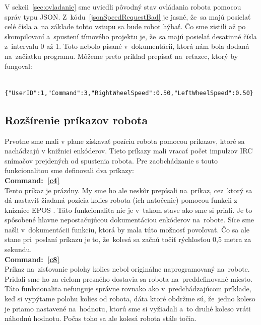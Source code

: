 V sekcii~\ref{sec:ovladanie} sme uviedli pôvodný stav ovládania robota pomocou správ typu JSON.
Z~kódu~\ref{jsonSpeedRequestBad} je jasné, že~sa majú posielať celé čísla a~na základe tohto vstupu sa bude robot hýbať. Čo sme zistili až
po skompilovaní a~spustení tímového projektu je, že~sa majú posielať desatinné čísla z~intervalu 0 až 1. Toto nebolo písané
v~dokumentácii, ktorá nám bola dodaná na~začiatku programu. Môžeme preto príklad prepísať na~reťazec, ktorý by fungoval:

	\label{jsonSpeedRequestGood}
	\begin{lstlisting}
			{"UserID":1,"Command":3,"RightWheelSpeed":0.50,"LeftWheelSpeed":0.50}
	\end{lstlisting}

\subsection{Rozšírenie príkazov robota}
\label{subsec:extendRobotCommands}

Prvotne sme mali v plane získavať pozíciu robota pomocou príkazov, ktoré sa nachádzajú v knižnici enkóderov.
Tieto príkazy mali vracať počet impulzov IRC snímačov prejdených od spustenia robota.
Pre zaobchádzanie s touto funkcionalitou sme definovali dva príkazy:\\

\noindent \textbf{Command:~\ref{c4}} \\
\indent Tento príkaz je prázdny. My sme ho ale neskôr prepísali na~príkaz, cez~ktorý sa dá nastaviť
žiadaná pozícia kolies robota (ich natočenie) pomocou funkcii z kniznice EPOS \cite{EPOSdoc}.
Táto funkcionalita nie je v~takom stave ako sme si priali. Je to spôsobené hlavne nepostačujúcou dokumentáciou enkóderov na~robote. Síce sme našli
v~dokumentácii funkciu, ktorá by mala túto možnosť povoľovať. Čo sa ale stane pri~poslaní príkazu je to, že~kolesá sa začnú točiť rýchlosťou
0,5 metra za sekundu.\\

\noindent \textbf{Command:~\ref{c8}} \\
\indent Príkaz na~zisťovanie polohy kolies nebol originálne naprogramovaný na~robote. Pridali sme ho za cieľom presného dostavia sa robota
na~preddefinované miesto. Táto funkcionalita nefunguje správne rovnako ako v~predchádzajúcom príklade, keď si vypýtame polohu kolies od robota,
dáta ktoré obdržme sú, že~jedno koleso je priamo nastavené na~hodnotu, ktorú sme si vyžiadali a~to druhé koleso vráti náhodnú hodnotu.
Počas toho sa ale kolesá robota stále točia.\\

